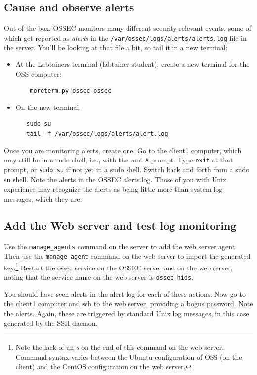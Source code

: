 \subsection{Cause and observe alerts}
Out of the box, OSSEC monitors many different security relevant events, some of which get reported as \textit{alerts} in the
{\tt /var/ossec/logs/alerts/alerts.log} file in the server.  You'll be looking at that file a bit, so tail it in a new terminal:
\begin{itemize}
\item At the Labtainers terminal (labtainer-student), create a new terminal for the OSS computer:
\begin{verbatim}
    moreterm.py ossec ossec
\end{verbatim}
\item On the new terminal:
\begin{verbatim}
   sudo su
   tail -f /var/ossec/logs/alerts/alert.log
\end{verbatim}
\end{itemize}
Once you are monitoring alerts, create one.  Go to the client1 computer, which may still be in a sudo shell, i.e., with
the root {\tt \#} prompt.  Type {\tt exit} at that prompt, or {\tt sudo su} if not yet in a sudo shell. 
Switch back and forth from a sudo su shell.  Note the alerts in
the OSSEC alerts.log.  Those of you with Unix experience may recognize the alerts as being little more than system log 
messages, which they are.  

\subsection{Add the Web server and test log monitoring}
Use the {\tt manage\_agents} command on the server to add the web server agent.  Then use the {\tt manage\_agent} command
on the web server to import the generated key.\footnote{Note the lack of an \textit{s} on the end of this command on the
web server.  Command syntax varies between the Ubuntu configuration of OSS (on the client) and the CentOS configuration
on the web server.}  Restart the ossec service on the OSSEC server and on the web server, noting that the service name
on the web server is {\tt ossec-hids}.

You should have seen alerts in the alert log for each of these actions.  Now go to the client1 computer and ssh to the web server, 
providing a bogus password.  Note the alerts.  Again, these are triggered by standard Unix log messages, in this case generated
by the SSH daemon.

